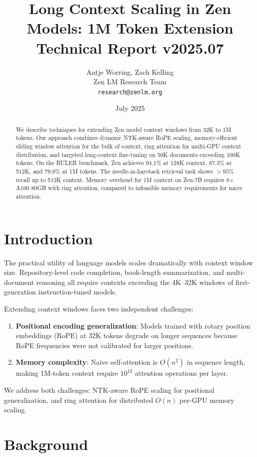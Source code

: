 \documentclass[11pt,a4paper]{article}
\title{\textbf{Long Context Scaling in Zen Models: 1M Token Extension}\\
\large Technical Report v2025.07}
\author{Antje Worring, Zach Kelling \\ Zen LM Research Team\\
\texttt{research@zenlm.org}}
\date{July 2025}
\begin{document}
\maketitle

\begin{abstract}
We describe techniques for extending Zen model context windows from 32K to 1M tokens.
Our approach combines dynamic NTK-aware RoPE scaling, memory-efficient sliding window
attention for the bulk of context, ring attention for multi-GPU context distribution,
and targeted long-context fine-tuning on 50K documents exceeding 100K tokens. On
the RULER benchmark, Zen achieves 94.1\% at 128K context, 87.3\% at 512K, and
79.8\% at 1M tokens. The needle-in-haystack retrieval task shows $>95\%$ recall
up to 512K context. Memory overhead for 1M context on Zen-7B requires 8$\times$A100
80GB with ring attention, compared to infeasible memory requirements for naive attention.
\end{abstract}

\section{Introduction}

The practical utility of language models scales dramatically with context window size.
Repository-level code completion, book-length summarization, and multi-document
reasoning all require contexts exceeding the 4K--32K windows of first-generation
instruction-tuned models.

Extending context windows faces two independent challenges:
\begin{enumerate}
  \item \textbf{Positional encoding generalization}: Models trained with rotary position
    embeddings (RoPE) at 32K tokens degrade on longer sequences because RoPE frequencies
    were not calibrated for larger positions.
  \item \textbf{Memory complexity}: Naive self-attention is $O(n^2)$ in sequence length,
    making 1M-token context require $10^{12}$ attention operations per layer.
\end{enumerate}

We address both challenges: NTK-aware RoPE scaling for positional generalization,
and ring attention for distributed $O(n)$ per-GPU memory scaling.

\section{Background}
\end{document}
